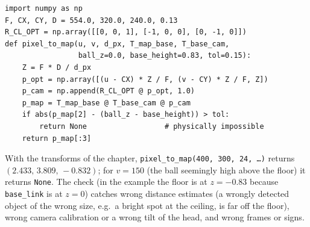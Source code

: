 \begin{enumerate}[label=\textbf{\ansnum.\arabic*}]
\begin{verbatim}
import numpy as np
F, CX, CY, D = 554.0, 320.0, 240.0, 0.13
R_CL_OPT = np.array([[0, 0, 1], [-1, 0, 0], [0, -1, 0]])
def pixel_to_map(u, v, d_px, T_map_base, T_base_cam,
                 ball_z=0.0, base_height=0.83, tol=0.15):
    Z = F * D / d_px
    p_opt = np.array([(u - CX) * Z / F, (v - CY) * Z / F, Z])
    p_cam = np.append(R_CL_OPT @ p_opt, 1.0)
    p_map = T_map_base @ T_base_cam @ p_cam
    if abs(p_map[2] - (ball_z - base_height)) > tol:
        return None                  # physically impossible
    return p_map[:3]
\end{verbatim}
  With the transforms of the chapter, \texttt{pixel\_to\_map(400, 300, 24, \ldots)} returns $(2.433,\,3.809,\,-0.832)$; for $v=150$ (the ball seemingly high above the floor) it returns \verb!None!. The check (in the example the floor is at $z=-0.83$ because \verb!base_link! is at $z=0$) catches wrong distance estimates (a wrongly detected object of the wrong size, e.g.\ a bright spot at the ceiling, is far off the floor), wrong camera calibration or a wrong tilt of the head, and wrong frames or signs.
\end{enumerate}
